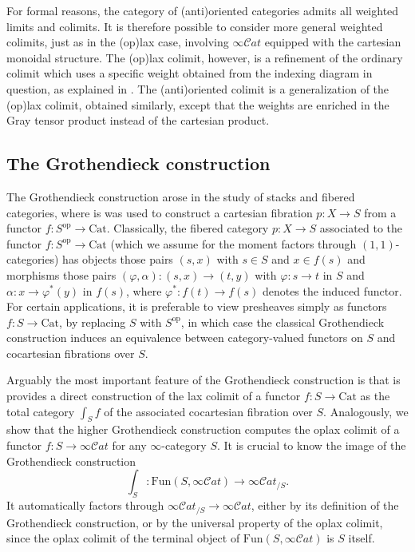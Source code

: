 \documentclass[10pt,oneside]{article}
\numberwithin{equation}{section} %
\numberwithin{figure}{section} %
\theoremstyle{plain}
\theoremstyle{definition}
\newcommand{\op}{\mathrm{op}}
\newcommand{\Cat}{\mathrm{Cat}}
\newcommand{\Fun}{\mathrm{Fun}}
\newcommand{\scat}{\mathcal{C}\mathit{at}}
\begin{document}
For formal reasons, the category of (anti)oriented categories admits all weighted limits and colimits.
It is therefore possible to consider more general weighted colimits, just as in the (op)lax case, involving $\infty\scat$ equipped with the cartesian monoidal structure.
The (op)lax colimit, however, is a refinement of the ordinary colimit which uses a specific weight obtained from the indexing diagram in question, as explained in \cite{articles}.
The (anti)oriented colimit is a generalization of the (op)lax colimit,
obtained similarly, except that the weights are enriched in the Gray tensor product instead of the cartesian product.

\subsection{The Grothendieck construction}
The Grothendieck construction arose in the study of stacks and fibered categories, where is was used to construct a cartesian fibration $p:X\to S$ from a functor $f:S^{\op}\to\Cat$.
Classically, the fibered category $p:X\to S$ associated to the functor $f:S^{\op}\to\Cat$ (which we assume for the moment factors through $(1,1)$-categories) has objects those pairs $(s,x)$ with $s\in S$ and $x\in f(s)$ and morphisms those pairs $(\varphi,\alpha):(s,x)\to (t,y)$ with $\varphi:s\to t$ in $S$ and $\alpha:x\to \varphi^*(y)$ in $f(s)$, where $\varphi^*:f(t)\to f(s)$ denotes the induced functor.
For certain applications, it is preferable to view presheaves simply as functors $f:S\to\Cat$, by replacing $S$ with $S^{\op}$, in which case the classical Grothendieck construction induces an equivalence between category-valued functors on $S$ and cocartesian fibrations over $S$.

Arguably the most important feature of the Grothendieck construction is that is provides a direct construction of the lax colimit of a functor $f:S\to\Cat$ as the total category $\int_S f$ of the associated cocartesian fibration over $S$.
Analogously, we show that the higher Grothendieck construction computes the oplax colimit of a functor $f:S\to\infty\scat$ for any $\infty$-category $S$.
It is crucial to know the image of the Grothendieck construction
\[
\int_S:\Fun(S,\infty\scat)\to\infty\scat_{/S}.
\]
It automatically factors through $\infty\scat_{/S}\to\infty\scat$, either by its definition of the Grothendieck construction, or by the universal property of the oplax colimit, since the oplax colimit of the terminal object of $\Fun(S,\infty\scat)$ is $S$ itself.
\end{document}
